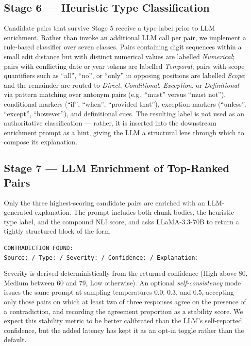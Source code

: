 \documentclass[conference]{IEEEtran}
\begin{document}
\subsection{Stage 6 --- Heuristic Type Classification}
Candidate pairs that survive Stage 5 receive a type label prior to LLM enrichment. Rather than invoke an additional LLM call per pair, we implement a rule-based classifier over seven classes. Pairs containing digit sequences within a small edit distance but with distinct numerical values are labelled \emph{Numerical}; pairs with conflicting date or year tokens are labelled \emph{Temporal}; pairs with scope quantifiers such as ``all'', ``no'', or ``only'' in opposing positions are labelled \emph{Scope}; and the remainder are routed to \emph{Direct}, \emph{Conditional}, \emph{Exception}, or \emph{Definitional} via pattern matching over antonym pairs (e.g.\ ``must'' versus ``must not''), conditional markers (``if'', ``when'', ``provided that''), exception markers (``unless'', ``except'', ``however''), and definitional cues. The resulting label is not used as an authoritative classification --- rather, it is inserted into the downstream enrichment prompt as a hint, giving the LLM a structural lens through which to compose its explanation.
\subsection{Stage 7 --- LLM Enrichment of Top-Ranked Pairs}
Only the three highest-scoring candidate pairs are enriched with an LLM-generated explanation. The prompt includes both chunk bodies, the heuristic type label, and the compound NLI score, and asks LLaMA-3.3-70B to return a tightly structured block of the form
\begin{center}
\texttt{CONTRADICTION FOUND:}\\
\texttt{Source: / Type: / Severity: / Confidence: / Explanation:}
\end{center}
Severity is derived deterministically from the returned confidence (High above 80, Medium between 60 and 79, Low otherwise). An optional \emph{self-consistency} mode issues the same prompt at sampling temperatures 0.0, 0.3, and 0.5, accepting only those pairs on which at least two of three responses agree on the presence of a contradiction, and recording the agreement proportion as a stability score. We expect this stability metric to be better calibrated than the LLM's self-reported confidence, but the added latency has kept it as an opt-in toggle rather than the default.
\end{document}
